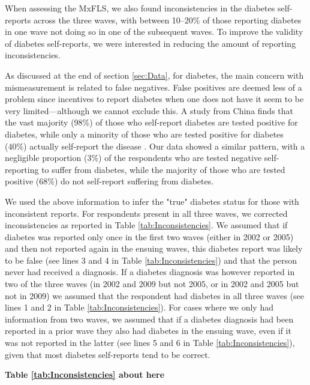 \documentclass[12pt,english]{article}
\begin{document}
\begin{appendix}
When assessing the \ac{MxFLS}, we also found inconsistencies in the diabetes self-reports across the three waves, with between 10--20\% of those reporting diabetes in one wave not doing so in one of the subsequent waves. To improve the validity of diabetes self-reports, we were interested in reducing the amount of reporting inconsistencies.

As discussed at the end of section \ref{sec:Data}, for diabetes, the main concern with mismeasurement is related to false negatives. False positives are deemed less of a problem since incentives to report diabetes when one does not have it seem to be very limited---although we cannot exclude this.  A study from China finds that the vast majority (98\%) of those who self-report diabetes are tested positive for diabetes, while only a minority  of those who are tested positive for diabetes (40\%) actually self-report the disease \parencite{Yuan2015}.  Our data showed a similar pattern, with a negligible proportion (3\%) of the respondents who are tested negative self-reporting to suffer from diabetes, while the majority of those who are tested positive (68\%) do not self-report suffering from diabetes.

We used the above information to infer the "true" diabetes status for those with inconsistent reports. For respondents present in all three waves, we corrected inconsistencies as reported in Table \ref{tab:Inconsistencies}. We assumed that if diabetes was reported only once in the first two waves (either in 2002 or 2005) and then not reported again in the ensuing waves, this diabetes report was likely to be false (see lines 3 and 4 in Table \ref{tab:Inconsistencies}) and that the person never had received a diagnosis. If a diabetes diagnosis was however reported in two of the three waves (in 2002 and 2009 but not 2005, or in 2002 and 2005 but not in 2009) we assumed that the respondent had diabetes in all three waves (see lines 1 and 2 in Table \ref{tab:Inconsistencies}). For cases where we only had information from two waves, we assumed that if a diabetes diagnosis had been reported in a prior wave they also had diabetes in the ensuing wave, even if it was not reported in the latter (see lines 5 and 6 in Table \ref{tab:Inconsistencies}), given that most diabetes self-reports tend to be correct.


\begin{center}
	\textbf{Table \ref{tab:Inconsistencies} about here}
\end{center}





\end{appendix}
\end{document}
